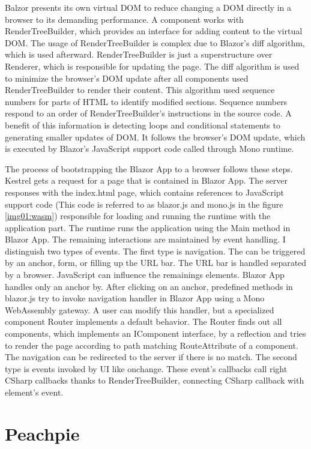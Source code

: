 Balzor presents its own virtual DOM to reduce changing a DOM directly in a browser to its demanding performance.
A component works with RenderTreeBuilder, which provides an interface for adding content to the virtual DOM.
The usage of RenderTreeBuilder is complex due to Blazor's diff algorithm, which is used afterward.
RenderTreeBuilder is just a superstructure over Renderer, which is responsible for updating the page.
The diff algorithm is used to minimize the browser's DOM  update after all components used RenderTreeBuilder to render their content.
This algorithm used sequence numbers for parts of HTML to identify modified sections.
Sequence numbers respond to an order of RenderTreeBuilder's instructions in the source code.
A benefit of this information is detecting loops and conditional statements to generating smaller updates of DOM.  
It follows the browser's DOM update, which is executed by Blazor's JavaScript support code called through Mono runtime.

The process of bootstrapping the Blazor App to a browser follows these steps. 
Kestrel gets a request for a page that is contained in Blazor App. 
The server responses with the index.html page, which contains references to JavaScript support code (This code is referred to as blazor.js and mono.js in the figure \ref{img01:wasm}) responsible for loading and running the runtime with the application part.
The runtime runs the application using the Main method in Blazor App.
The remaining interactions are maintained by event handling.
I distinguish two types of events.
The first type is navigation.
The \cite{navigation} can be triggered by an anchor, form, or filling up the URL bar.
The URL bar is handled separated by a browser.
JavaScript can influence the remainings elements.
Blazor App handles only an anchor by.
After clicking on an anchor, predefined methods in blazor.js try to invoke navigation handler in Blazor App using a Mono WebAssembly gateway.
A user can modify this handler, but a specialized component Router implements a default behavior.
The Router finds out all components, which implements an IComponent interface, by a reflection and tries to render the page according to path matching RouteAttribute of a component.
The navigation can be redirected to the server if there is no match.
The second type is events invoked by UI like onchange. These event's callbacks call right CSharp callbacks thanks to RenderTreeBuilder, connecting CSharp callback with element's event.

\section{Peachpie}

